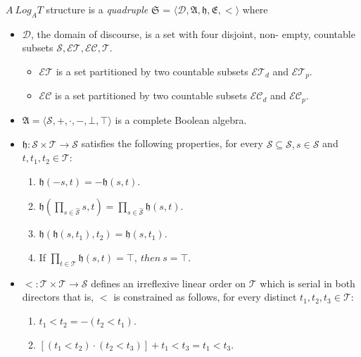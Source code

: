 \begin{defn} $A  \ Log_AT$ structure is a \textit{quadruple} $\mathfrak{S}$
	= $\langle \mathcal{D}, \mathfrak{A}, \mathfrak{h},\mathfrak{E}, < \rangle$ where
\end{defn}

\begin{itemize}
	\item $\mathcal{D}$,  the domain of discourse, is a set with four disjoint, non-
	      empty, countable subsets $\mathcal{S} , \mathcal{ET}, \mathcal{EC},  \mathcal{T}$.
	      \begin{itemize}
		      \item $\mathcal{ET}$ is a set partitioned by two countable subsets $\mathcal{ET}_d$ and $\mathcal{ET}_p$.
		      \item $\mathcal{EC}$ is a set partitioned by two countable subsets $\mathcal{EC}_d$ and $\mathcal{EC}_p$.
	      \end{itemize}
	\item $\mathfrak{A} = \langle \mathcal{S}, +, \cdot, -, \bot, \top \rangle $ is a
	      complete Boolean algebra.
	\item $\mathfrak{h} : \mathcal{S} \times \mathcal{T} \to \mathcal{S}$ satisfies the following properties,
	      for every $\hat{\mathcal{S}} \subseteq \mathcal{S}, s \in \mathcal{S}$ and $t, t_1, t_2 \in \mathcal{T}$:
	      \begin{enumerate}
		      \item $\mathfrak{h}(-s, t)= -  \mathfrak{h}(s, t)$.
		      \item $\displaystyle \mathfrak{h}(\prod_{s\in \hat{\mathcal{S}}} s, t) = \prod_{s\in \hat{\mathcal{S}}} \mathfrak{h}(s, t)$.
		      \item $\mathfrak{h}(\mathfrak{h}(s, t_1), t_2) = \mathfrak{h}(s, t_1)$.
		      \item If $\displaystyle \prod_{t \in \mathcal{T}} \mathfrak{h}(s, t)= \top, \ then \ s = \top$.
	      \end{enumerate}
	\item $< : \mathcal{T} \times \mathcal{T} \to \mathcal{S}$ defines an irreflexive linear order on $\mathcal{T}$ which is serial in both
	      directors that is, $<$ is constrained as follows, for every distinct $t_1, t_2, t_3 \in \mathcal{T}$:
	      \begin{enumerate}
		      \item $t_1 < t_2 = - (t_2 < t_1)$.
		      \item $[(t_1 < t_2) \cdot (t_2 < t_3)] + t_1 < t_3 = t_1 < t_3$.

\end{enumerate}
\end{itemize}
